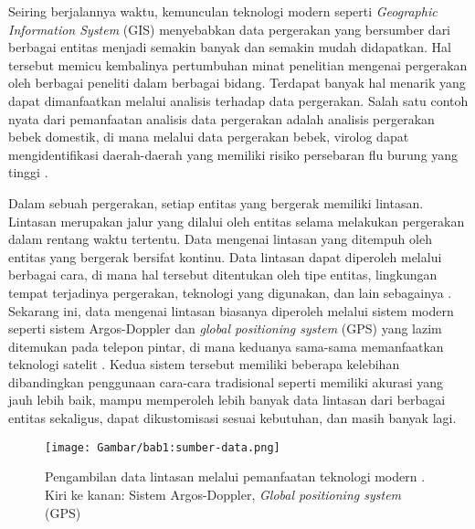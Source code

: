 

Seiring berjalannya waktu, kemunculan teknologi modern seperti \textit{Geographic Information System} (GIS) menyebabkan data pergerakan yang bersumber dari berbagai entitas menjadi semakin banyak dan semakin mudah didapatkan. Hal tersebut memicu kembalinya pertumbuhan minat penelitian mengenai pergerakan oleh berbagai peneliti dalam berbagai bidang. Terdapat banyak hal menarik yang dapat dimanfaatkan melalui analisis terhadap data pergerakan. Salah satu contoh nyata dari pemanfaatan analisis data pergerakan adalah analisis pergerakan bebek domestik, di mana melalui data pergerakan bebek, virolog dapat mengidentifikasi daerah-daerah yang memiliki risiko persebaran flu burung yang tinggi \cite{diann:01:movement-analysis}.

Dalam sebuah pergerakan, setiap entitas yang bergerak memiliki lintasan. Lintasan merupakan jalur yang dilalui oleh entitas selama melakukan pergerakan dalam rentang waktu tertentu. Data mengenai lintasan yang ditempuh oleh entitas yang bergerak bersifat kontinu. Data lintasan dapat diperoleh melalui berbagai cara, di mana hal tersebut ditentukan oleh tipe entitas, lingkungan tempat terjadinya pergerakan, teknologi yang digunakan, dan lain sebagainya \cite{wiratma:trajectory}. Sekarang ini, data mengenai lintasan biasanya diperoleh melalui sistem modern seperti sistem Argos-Doppler dan \textit{global positioning system} (GPS) yang lazim ditemukan pada telepon pintar, di mana keduanya sama-sama memanfaatkan teknologi satelit \cite{carter:argos}. Kedua sistem tersebut memiliki beberapa kelebihan dibandingkan penggunaan cara-cara tradisional seperti memiliki akurasi yang jauh lebih baik, mampu memperoleh lebih banyak data lintasan dari berbagai entitas sekaligus, dapat dikustomisasi sesuai kebutuhan, dan masih banyak lagi.

\begin{figure}[h]
    \centering
    \texttt{[image: Gambar/bab1:sumber-data.png]}
    \caption[Teknologi pengambilan data lintasan]{Pengambilan data lintasan melalui pemanfaatan teknologi modern \cite{carter:argos}. Kiri ke kanan: Sistem Argos-Doppler, \textit{Global positioning system} (GPS)}
    \label{bab1:sumber-data}
\end{figure}

